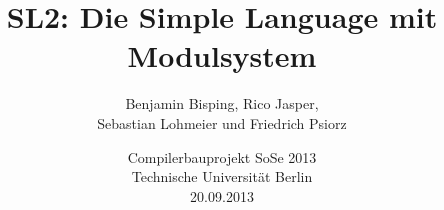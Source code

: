 \documentclass{beamer}
\title{SL2: Die Simple Language mit Modulsystem}
\author{Benjamin Bisping, Rico Jasper,\\Sebastian Lohmeier und Friedrich Psiorz}
\date{Compilerbauprojekt SoSe 2013\\
Technische Universität Berlin\\
20.09.2013}
\begin{document}
\begin{frame}
\titlepage
\end{frame}

\begin{frame}
\tableofcontents
\end{frame}










%
\end{document}
